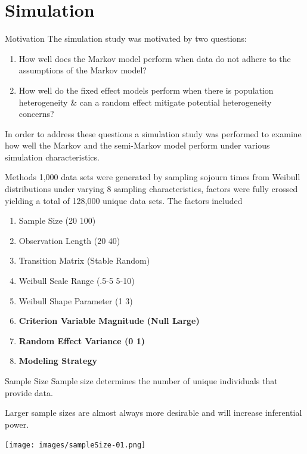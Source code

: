 \documentclass[
  ignorenonframetext,
]{beamer}
\begin{document}
\section{Simulation}\label{simulation}

\begin{frame}{Motivation}
\label{motivation}
The simulation study was motivated by two questions:

\begin{enumerate}
\item
  How well does the Markov model perform when data do not adhere to the
  assumptions of the Markov model?
\item
  How well do the fixed effect models perform when there is population
  heterogeneity \& can a random effect mitigate potential heterogeneity
  concerns?
\end{enumerate}

In order to address these questions a simulation study was performed to
examine how well the Markov and the semi-Markov model perform under
various simulation characteristics.
\end{frame}

\begin{frame}{Methods}
\label{methods}
1,000 data sets were generated by sampling sojourn times from Weibull
distributions under varying 8 sampling characteristics, factors were
fully crossed yielding a total of 128,000 unique data sets. The factors
included

\begin{enumerate}
\item
  Sample Size (20 \textbar{} 100)
\item
  Observation Length (20 \textbar{} 40)
\item
  Transition Matrix (Stable \textbar{} Random)
\item
  Weibull Scale Range (.5-5 \textbar{} 5-10)
\item
  Weibull Shape Parameter (1 \textbar{} 3)
\item
  \textbf{Criterion Variable Magnitude (Null \textbar{} Large)}
\item
  \textbf{Random Effect Variance (0 \textbar{} 1)}
\item
  \textbf{Modeling Strategy}
\end{enumerate}
\end{frame}

\begin{frame}{Sample Size}
\label{sample-size}
Sample size determines the number of unique individuals that provide
data.

Larger sample sizes are almost always more desirable and will increase
inferential power.

\begin{block}{}
\label{section}
\texttt{[image: images/sampleSize-01.png]}
\end{block}
\end{frame}
\end{document}
